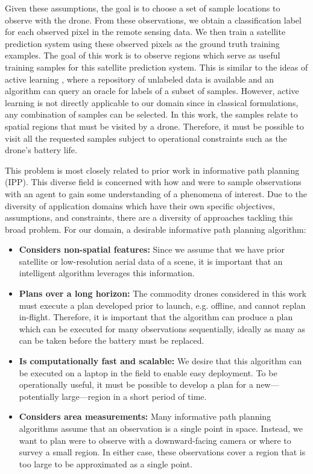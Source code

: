 Given these assumptions, the goal is to choose a set of sample locations to observe with the drone. From these observations, we obtain a classification label for each observed pixel in the remote sensing data. We then train a satellite prediction system using these observed pixels as the ground truth training examples. The goal of this work is to observe regions which serve as useful training samples for this satellite prediction system. This is similar to the ideas of active learning \cite{Ren2022ALearning}, where a repository of unlabeled data is available and an algorithm can query an oracle for labels of a subset of samples. However, active learning is not directly applicable to our domain since in classical formulations, any combination of samples can be selected. In this work, the samples relate to spatial regions that must be visited by a drone. Therefore, it must be possible to visit all the requested samples subject to operational constraints such as the drone's battery life.

This problem is most closely related to prior work in informative path planning (IPP). This diverse field is concerned with how and were to sample observations with an agent to gain some understanding of a phenomena of interest. Due to the diversity of application domains which have their own specific objectives, assumptions, and constraints, there are a diversity of approaches tackling this broad problem. For our domain, a desirable informative path planning algorithm:

\begin{itemize}
    \item \textbf{Considers non-spatial features:} Since we assume that we have prior satellite or low-resolution aerial data of a scene, it is important that an intelligent algorithm leverages this information.
    \item \textbf{Plans over a long horizon:} The commodity drones considered in this work must execute a plan developed prior to launch, e.g. offline, and cannot replan in-flight.
    Therefore, it is important that the algorithm can produce a plan which can be executed for many observations sequentially, ideally as many as can be taken before the battery must be replaced. 
    \item \textbf{Is computationally fast and scalable:} We desire that this algorithm can be executed on a laptop in the field to enable easy deployment.
    To be operationally useful, it must be possible to develop a plan for a new---potentially large---region in a short period of time.
    \item \textbf{Considers area measurements:} Many informative path planning algorithms assume that an observation is a single point in space. Instead, we want to plan were to observe with a downward-facing camera or where to survey a small region. In either case, these observations cover a region that is too large to be approximated as a single point.
\end{itemize}




